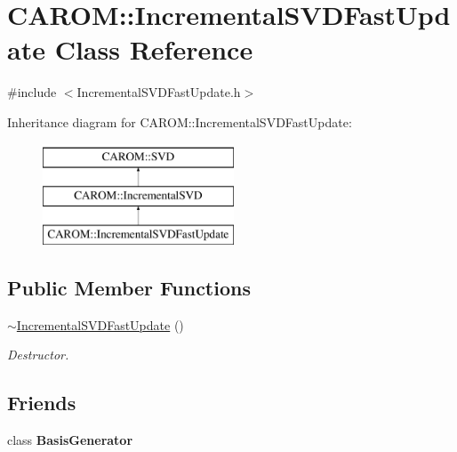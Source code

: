 \hypertarget{class_c_a_r_o_m_1_1_incremental_s_v_d_fast_update}{\section{C\-A\-R\-O\-M\-:\-:Incremental\-S\-V\-D\-Fast\-Update Class Reference}
\label{class_c_a_r_o_m_1_1_incremental_s_v_d_fast_update}
}


{\ttfamily \#include $<$Incremental\-S\-V\-D\-Fast\-Update.\-h$>$}

Inheritance diagram for C\-A\-R\-O\-M\-:\-:Incremental\-S\-V\-D\-Fast\-Update\-:\begin{figure}[H]
\begin{center}
\leavevmode
\includegraphics[height=3.000000cm]{class_c_a_r_o_m_1_1_incremental_s_v_d_fast_update}
\end{center}
\end{figure}
\subsection*{Public Member Functions}
\begin{DoxyCompactItemize}
\item 
\hypertarget{class_c_a_r_o_m_1_1_incremental_s_v_d_fast_update_a3d08aaf594df544494e116980c0352fe}{\hyperlink{class_c_a_r_o_m_1_1_incremental_s_v_d_fast_update_a3d08aaf594df544494e116980c0352fe}{$\sim$\-Incremental\-S\-V\-D\-Fast\-Update} ()}\label{class_c_a_r_o_m_1_1_incremental_s_v_d_fast_update_a3d08aaf594df544494e116980c0352fe}

\begin{DoxyCompactList}\small\item\em Destructor. \end{DoxyCompactList}\end{DoxyCompactItemize}
\subsection*{Friends}
\begin{DoxyCompactItemize}
\item 
\hypertarget{class_c_a_r_o_m_1_1_incremental_s_v_d_fast_update_a14677f178902af98cccb02b0058fd326}{class {\bfseries Basis\-Generator}}\label{class_c_a_r_o_m_1_1_incremental_s_v_d_fast_update_a14677f178902af98cccb02b0058fd326}

\end{DoxyCompactItemize}
